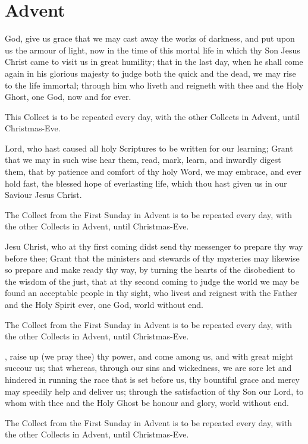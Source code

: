 \section{Advent}

 God, give us grace that we may cast away the works of darkness, and put upon us the armour of light, now in the time of this mortal life in which thy Son Jesus Christ came to visit us in great humility; that in the last day, when he shall come again in his glorious majesty to judge both the quick and the dead, we may rise to the life immortal; through him who liveth and reigneth with thee and the Holy Ghost, one God, now and for ever.
\begin{secrubric}
This Collect is to be repeated every day, with the other Collects in Advent, until Christmas-Eve.
\end{secrubric}

 Lord, who hast caused all holy Scriptures to be written for our learning; Grant that we may in such wise hear them, read, mark, learn, and inwardly digest them, that by patience and comfort of thy holy Word, we may embrace, and ever hold fast, the blessed hope of everlasting life, which thou hast given us in our Saviour Jesus Christ.
\begin{secrubric}
The Collect from the First Sunday in Advent is to be repeated every day, with the other Collects in Advent, until Christmas-Eve.
\end{secrubric}

 Jesu Christ, who at thy first coming didst send thy messenger to prepare thy way before thee; Grant that the ministers and stewards of thy mysteries may likewise so prepare and make ready thy way, by turning the hearts of the disobedient to the wisdom of the just, that at thy second coming to judge the world we may be found an acceptable people in thy sight, who livest and reignest with the Father and the Holy Spirit ever, one God, world without end.
\begin{secrubric}
The Collect from the First Sunday in Advent is to be repeated every day, with the other Collects in Advent, until Christmas-Eve.
\end{secrubric}

, raise up (we pray thee) thy power, and come among us, and with great might succour us; that whereas, through our sins and wickedness, we are sore let and hindered in running the race that is set before us, thy bountiful grace and mercy may speedily help and deliver us; through the satisfaction of thy Son our Lord, to whom with thee and the Holy Ghost be honour and glory, world without end.
\begin{secrubric}
The Collect from the First Sunday in Advent is to be repeated every day, with the other Collects in Advent, until Christmas-Eve.
\end{secrubric}

